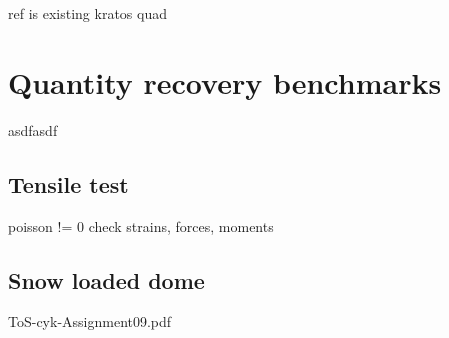 \doublespacing

ref is existing kratos quad

\section{Quantity recovery benchmarks}

asdfasdf

\subsection{Tensile test}

poisson != 0
check strains, forces, moments

\subsection{Snow loaded dome}

ToS-cyk-Assignment09.pdf

